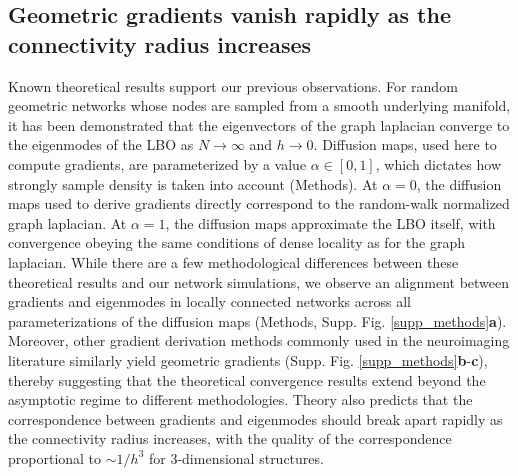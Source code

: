\documentclass{article}
\begin{document}
\subsection*{Geometric gradients vanish rapidly as the connectivity radius increases}

Known theoretical results support our previous observations. For random geometric networks whose nodes are sampled from a smooth underlying manifold, it has been demonstrated that the eigenvectors of the graph laplacian converge to the eigenmodes of the LBO as $N\to \infty$ and $h\to 0$\cite{GarcaTrillos2019}. Diffusion maps, used here to compute gradients, are parameterized by a value $\alpha \in [0, 1]$, which dictates how strongly sample density is taken into account (Methods). At $\alpha=0$, the diffusion maps used to derive gradients directly correspond to the random-walk normalized graph laplacian. At $\alpha = 1$, the diffusion maps approximate the LBO itself, with convergence obeying the same conditions of dense locality as for the graph laplacian\cite{Coifman2006}. While there are a few methodological differences between these theoretical results and our network simulations, we observe an alignment between gradients and eigenmodes in locally connected networks across all parameterizations of the diffusion maps (Methods, Supp. Fig. \ref{supp_methods}\textbf{a}). Moreover, other gradient derivation methods commonly used in the neuroimaging literature similarly yield geometric gradients (Supp. Fig. \ref{supp_methods}\textbf{b}-\textbf{c}), thereby suggesting that the theoretical convergence results extend beyond the asymptotic regime to different methodologies. Theory also predicts that the correspondence between gradients and eigenmodes should break apart rapidly as the connectivity radius increases, with the quality of the correspondence proportional to $\sim 1/h^3$ for 3-dimensional structures.
\end{document}
